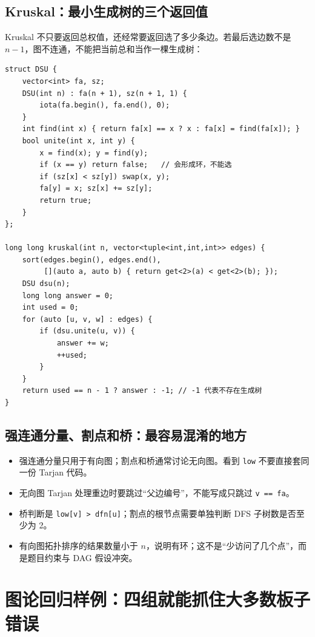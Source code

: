 \documentclass[UTF8,openany,oneside,zihao=-4]{ctexbook}
\begin{document}
\subsection{Kruskal：最小生成树的三个返回值}

Kruskal 不只要返回总权值，还经常要返回选了多少条边。若最后选边数不是 $n-1$，图不连通，不能把当前总和当作一棵生成树：

\begin{lstlisting}
struct DSU {
    vector<int> fa, sz;
    DSU(int n) : fa(n + 1), sz(n + 1, 1) {
        iota(fa.begin(), fa.end(), 0);
    }
    int find(int x) { return fa[x] == x ? x : fa[x] = find(fa[x]); }
    bool unite(int x, int y) {
        x = find(x); y = find(y);
        if (x == y) return false;   // 会形成环，不能选
        if (sz[x] < sz[y]) swap(x, y);
        fa[y] = x; sz[x] += sz[y];
        return true;
    }
};

long long kruskal(int n, vector<tuple<int,int,int>> edges) {
    sort(edges.begin(), edges.end(),
         [](auto a, auto b) { return get<2>(a) < get<2>(b); });
    DSU dsu(n);
    long long answer = 0;
    int used = 0;
    for (auto [u, v, w] : edges) {
        if (dsu.unite(u, v)) {
            answer += w;
            ++used;
        }
    }
    return used == n - 1 ? answer : -1; // -1 代表不存在生成树
}
\end{lstlisting}

\subsection{强连通分量、割点和桥：最容易混淆的地方}

\begin{itemize}
  \item 强连通分量只用于有向图；割点和桥通常讨论无向图。看到 \lstinline|low| 不要直接套同一份 Tarjan 代码。
  \item 无向图 Tarjan 处理重边时要跳过“父边编号”，不能写成只跳过 \lstinline|v == fa|。
  \item 桥判断是 \lstinline|low[v] > dfn[u]|；割点的根节点需要单独判断 DFS 子树数是否至少为 2。
  \item 有向图拓扑排序的结果数量小于 $n$，说明有环；这不是“少访问了几个点”，而是题目约束与 DAG 假设冲突。
\end{itemize}

\section{图论回归样例：四组就能抓住大多数板子错误}
\end{document}
